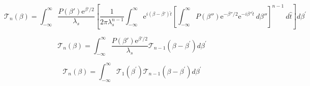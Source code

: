 \documentclass[../master.tex]{subfiles}
\begin{document}
				\begin{equation}
					\mathcal{T}_{n}(\beta)=\int_{-\infty}^{\infty}\frac{P(\beta')\mathrm{e}^{\beta'/2}}{\lambda_s}\left[\frac{1}{2\pi\lambda_s^{n-1}}\int_{-\infty}^{\infty}\mathrm{e}^{i(\beta-\beta')\hat{t}}\left[\int_{-\infty}^{\infty}P(\beta'')\mathrm{e}^{-\beta''/2}\mathrm{e}^{-i\beta''\hat{t}}~d\beta''\right]^{n-1}~d\hat{t}\right]d\beta^{\prime}
				\end{equation}

				\begin{equation}
					\mathcal{T}_{n}(\beta)=\int_{-\infty}^{\infty}\frac{P(\beta')\mathrm{e}^{\beta'/2}}{\lambda_s}\mathcal{T}_{n-1}\left(\beta-\beta^{\prime}\right)d\beta^{\prime}
				\end{equation}

				\begin{equation}
					\mathcal{T}_{n}(\beta)=\int_{-\infty}^{\infty}\mathcal{T}_{1}\left(\beta^{\prime}\right)\mathcal{T}_{n-1}\left(\beta-\beta^{\prime}\right)d\beta^{\prime}\label{ap:eq:finalTn}
				\end{equation}
\end{document}
